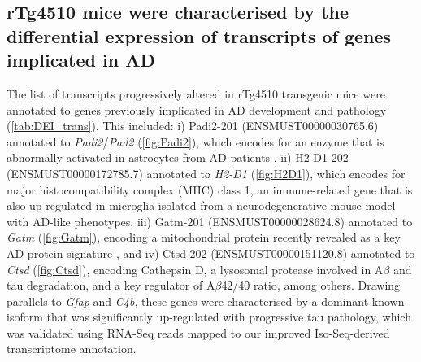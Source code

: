 \clearpage
\subsection{rTg4510 mice were characterised by the differential expression of transcripts of genes implicated in AD}
\label{ch5: diffisoexp}
The list of transcripts progressively altered in rTg4510 transgenic mice were annotated to genes previously implicated in AD development and pathology (\cref{tab:DEI_trans}). This included: i) Padi2-201 (ENSMUST00000030765.6) annotated to \textit{Padi2}/\textit{Pad2} (\cref{fig:Padi2}), which encodes for an enzyme that is abnormally activated in astrocytes from AD patients \cite{A2005}, ii) H2-D1-202 (ENSMUST00000172785.7) annotated to \textit{H2-D1} (\cref{fig:H2D1}), which encodes for major histocompatibility complex (MHC) class 1, an immune-related gene that is also up-regulated in microglia isolated from a neurodegenerative mouse model with AD-like phenotypes\cite{Mathys2017}, iii) Gatm-201 (ENSMUST00000028624.8) annotated to \textit{Gatm} (\cref{fig:Gatm}), encoding a mitochondrial protein recently revealed as a key AD protein signature \cite{Wang2020}, and iv) Ctsd-202 (ENSMUST00000151120.8) annotated to \textit{Ctsd} (\cref{fig:Ctsd}), encoding Cathepsin D, a lysosomal protease involved in A$\beta$ \cite{JR1996} and tau \cite{A1997} degradation, and a key regulator of A$\beta$42/40 ratio\cite{Suire2020}, among others. Drawing parallels to \textit{Gfap} and \textit{C4b}, these genes were characterised by a dominant known isoform that was significantly up-regulated with progressive tau pathology, which was validated using RNA-Seq reads mapped to our improved Iso-Seq-derived transcriptome annotation. 



